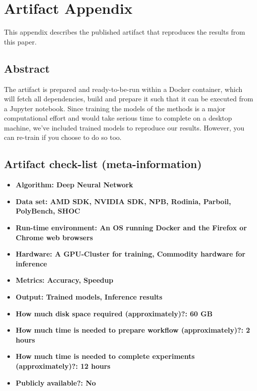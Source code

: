 
\appendix
\section{Artifact Appendix}
This appendix describes the published artifact that reproduces the results from this paper.

\subsection{Abstract}

The artifact is prepared and ready-to-be-run within a Docker container, which will fetch all dependencies, build and prepare it such that it can be executed from a Jupyter notebook.
Since training the models of the methods is a major computational effort and would take serious time to complete on a desktop machine, we've included trained models to reproduce our results. However, you can re-train if you choose to do so too.

\subsection{Artifact check-list (meta-information)}

{\small
\begin{itemize}
  \item {\bf Algorithm: Deep Neural Network}
  \item {\bf Data set: AMD SDK, NVIDIA SDK, NPB, Rodinia, Parboil, PolyBench, SHOC}
  \item {\bf Run-time environment: An OS running Docker and the Firefox or Chrome web browsers}
  \item {\bf Hardware: A GPU-Cluster for training, Commodity hardware for inference}
  \item {\bf Metrics: Accuracy, Speedup}
  \item {\bf Output: Trained models, Inference results}
  \item {\bf How much disk space required (approximately)?: 60 GB}
  \item {\bf How much time is needed to prepare workflow (approximately)?: 2 hours}
  \item {\bf How much time is needed to complete experiments (approximately)?: 12 hours}
  \item {\bf Publicly available?: No}
\end{itemize}
}

